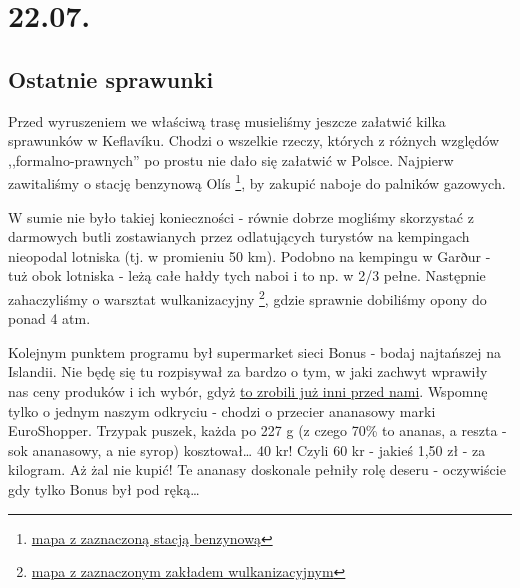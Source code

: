 \chapter*{22.07.}

\section*{Ostatnie sprawunki}

\indent Przed wyruszeniem we właściwą trasę musieliśmy jeszcze załatwić kilka sprawunków w Keflavíku. Chodzi o wszelkie rzeczy, których z różnych względów ,,formalno-prawnych'' po prostu nie dało się załatwić w Polsce.
Najpierw zawitaliśmy o stację benzynową Olís \footnote{\href{https://www.google.com/url?q=https\%3A\%2F\%2Fmaps.google.com\%2Fmaps\%3Fq\%3D63.979816\%2C-22.54672}{mapa z zaznaczoną stacją benzynową}}, by zakupić naboje do palników gazowych.

W sumie nie było takiej konieczności - równie dobrze mogliśmy skorzystać z darmowych butli zostawianych przez odlatujących turystów na kempingach nieopodal lotniska (tj. w promieniu 50 km). Podobno na kempingu w Garður - tuż obok lotniska - leżą całe hałdy tych naboi i to np. w 2/3 pełne.
Następnie zahaczyliśmy o warsztat wulkanizacyjny \footnote{\href{https://www.google.com/url?q=https\%3A\%2F\%2Fmaps.google.com\%2Fmaps\%3Fq\%3D63.982619\%2C-22.546328}{mapa z zaznaczonym zakładem wulkanizacyjnym}}, gdzie sprawnie dobiliśmy opony do ponad 4 atm.



Kolejnym punktem programu był supermarket sieci Bonus - bodaj najtańszej na Islandii. Nie będę się tu rozpisywał za bardzo o tym, w jaki zachwyt wprawiły nas ceny produków i ich wybór, gdyż \href{http://www.roboppy.net/food/2009/04/iceland-day-1-part-ii-reykjavik-bonus-supermarket-skyr.html}{to zrobili już inni przed nami}. Wspomnę tylko o jednym naszym odkryciu - chodzi o przecier ananasowy marki EuroShopper. Trzypak puszek, każda po 227 g (z czego 70\% to ananas, a reszta - sok ananasowy, a nie syrop) kosztował… 40 kr! Czyli 60 kr - jakieś 1,50 zł - za kilogram. Aż żal nie kupić! Te ananasy doskonale pełniły rolę deseru - oczywiście gdy tylko Bonus był pod ręką…

